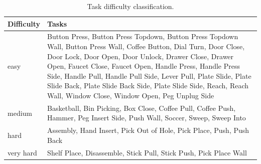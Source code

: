 \begin{table}[htbp]
  \begin{center}
  \caption{Task difficulty classification.}
    \begin{tabular}{m{2.5cm} m{12cm}}
      \toprule
      \textbf{Difficulty} & \textbf{Tasks} \\
      \midrule
      easy & Button Press, Button Press Topdown, Button Press Topdown Wall, Button Press Wall, Coffee Button, Dial Turn, Door Close, Door Lock, Door Open, Door Unlock, Drawer Close, Drawer Open, Faucet Close, Faucet Open, Handle Press, Handle Press Side, Handle Pull, Handle Pull Side, Lever Pull, Plate Slide, Plate Slide Back, Plate Slide Back Side, Plate Slide Side, Reach, Reach Wall, Window Close, Window Open, Peg Unplug Side \\
      \midrule
      medium & Basketball, Bin Picking, Box Close, Coffee Pull, Coffee Push, Hammer, Peg Insert Side, Push Wall, Soccer, Sweep, Sweep Into \\
      \midrule
      hard & Assembly, Hand Insert, Pick Out of Hole, Pick Place, Push, Push Back \\
      \midrule
      very hard & Shelf Place, Disassemble, Stick Pull, Stick Push, Pick Place Wall \\
      \bottomrule
    \end{tabular}
  \end{center}
\end{table}

